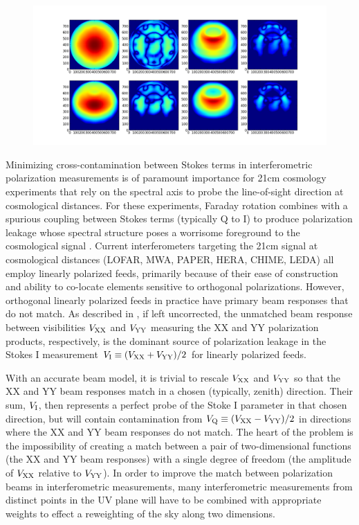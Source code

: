 \documentclass[twocolumn,apj,numberedappendix]{emulateapj}
\begin{document}
\begin{figure}\centering
\includegraphics[width=.9\columnwidth]{plots/fringe_beam_wgts.png}
\caption{
}\label{fig:fringe_beam_wgts}
\end{figure}


Minimizing cross-contamination between Stokes terms in interferometric polarization measurements
is of paramount importance for 21cm cosmology experiments that rely on
the spectral axis to probe the line-of-sight direction at cosmological distances.  For these
experiments, Faraday rotation combines
with a spurious coupling between Stokes terms (typically Q to I) to produce polarization leakage whose 
spectral structure poses a worrisome foreground
to the cosmological signal \citep{jelic_et_al2008,bernardi,moore_et_al2013,moore_et_al2015}.  Current interferometers
targeting the 21cm signal at cosmological distances (LOFAR, MWA, PAPER, HERA, CHIME, LEDA) all employ linearly
polarized feeds, primarily because of their ease of construction and ability to co-locate elements sensitive to
orthogonal polarizations.  However, orthogonal linearly polarized feeds in practice have primary beam responses
that do not match.  As described in \citet{moore_et_al2013}, if left uncorrected, the unmatched beam response 
between visibilities ${V_{\rm XX}}$ and ${V_{\rm YY}}$ measuring the XX and YY polarization products, respectively, is the 
dominant source of polarization leakage in the Stokes I measurement ${V_{\rm I}}\equiv({V_{\rm XX}}+{V_{\rm YY}})/2$ for
linearly polarized feeds.

With an accurate beam model, it is trivial to rescale ${V_{\rm XX}}$ and ${V_{\rm YY}}$ 
so that the XX and YY beam responses match in a chosen (typically, zenith) direction.  Their sum, ${V_{\rm I}}$, then
represents a perfect probe of the Stoke I parameter in that chosen direction, but will contain contamination
from ${V_{\rm Q}}\equiv({V_{\rm XX}}-{V_{\rm YY}})/2$ in directions where the XX and YY beam responses do not match.
The heart of the problem is the impossibility of creating a match between a pair of two-dimensional functions (the
XX and YY beam responses) with a single degree of freedom (the amplitude of ${V_{\rm XX}}$ relative to ${V_{\rm YY}}$).  In order
to improve the match between polarization beams in interferometric measurements, many interferometric measurements
from distinct points in the UV plane will have to be combined with appropriate weights to effect a reweighting
of the sky along two dimensions.
\end{document}
